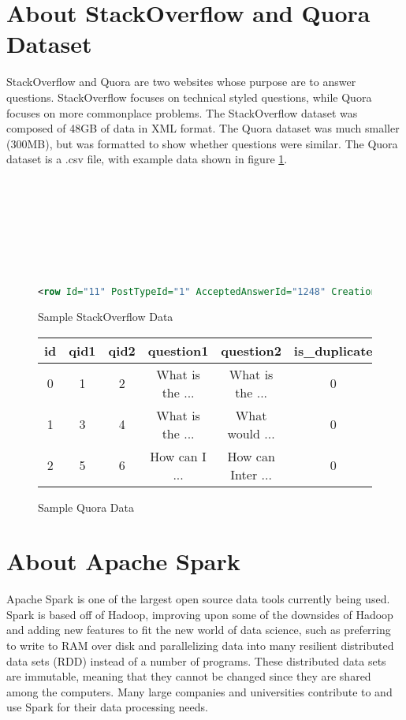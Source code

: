 \documentclass[9pt,twocolumn,twoside]{idsi}
\begin{document}
\section{About StackOverflow and Quora Dataset}
StackOverflow and Quora are two websites whose purpose are to answer questions. StackOverflow focuses on technical styled questions, while Quora focuses on more commonplace problems. The StackOverflow dataset was composed of 48GB of data in XML format. The Quora dataset was much smaller (300MB), but was formatted to show whether questions were similar. The Quora dataset is a .csv file, with example data shown in figure \ref{tab:qcsv}.\\
\\\\\\\\\\\\\\
\begin{figure}[h!] 
\begin{lstlisting}[language=xml]
<row Id="11" PostTypeId="1" AcceptedAnswerId="1248" CreationDate="2008-07-31T23:55:37.967" Score="1106" ViewCount="115048" Body="&lt;p&gt;Given a specific &lt;code&gt;..." OwnerUserId="1" LastEditorUserId="1136709" LastEditorDisplayName="user2370523" LastEditDate="2015-12-29T02:08:37.450" LastActivityDate="2016-07-13T23:23:58.537" Title="How can relative time be calculated in C#?" Tags="&lt;c#&gt;&lt;..." AnswerCount="33"/>
\end{lstlisting}
\caption{Sample StackOverflow Data}
\end{figure}

\begin{figure}[h!]
\begin{center}
\begin{tabular}{ |c|c|c|c|c|c| }
 \hline
 id & qid1 & qid2 & question1 & question2 & is\_duplicate\\
 \hline
 0 & 1 & 2 & What is the ... & What is the ... & 0 \\
 1 & 3 & 4 & What is the ... & What would ... & 0 \\
 2 & 5 & 6 & How can I ... & How can Inter ... & 0 \\
 \hline
\end{tabular}
\end{center}
\caption{Sample Quora Data}
\label{tab:qcsv}
\end{figure}

\section{About Apache Spark}
Apache Spark is one of the largest open source data tools currently being used. Spark is based off of Hadoop, improving upon some of the downsides of Hadoop and adding new features to fit the new world of data science, such as preferring to write to RAM over disk and parallelizing data into many resilient distributed data sets (RDD) instead of a number of programs. These distributed data sets are immutable, meaning that they cannot be changed since they are shared among the computers. Many large companies and universities contribute to and use Spark for their data processing needs.
\end{document}
